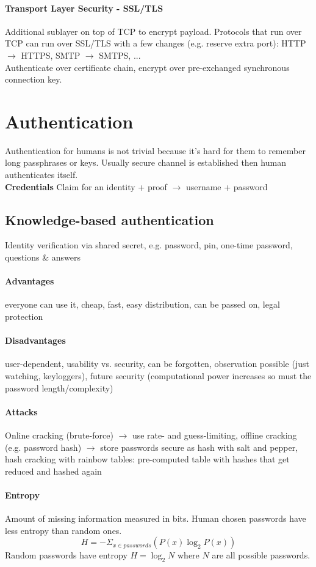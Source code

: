 \documentclass[12pt]{article}
\begin{document}
	\paragraph{Transport Layer Security - SSL/TLS} Additional sublayer on top of TCP to encrypt payload. Protocols that run over TCP can run over SSL/TLS with a few changes (e.g. reserve extra port): HTTP $\rightarrow$ HTTPS, SMTP $\rightarrow$ SMTPS, ...\\
	Authenticate over certificate chain, encrypt over pre-exchanged synchronous connection key.
	
	\section{Authentication}
	Authentication for humans is not trivial because it's hard for them to remember long passphrases or keys. Usually secure channel is established then human authenticates itself.\\
	\textbf{Credentials} Claim for an identity + proof $\rightarrow$ username + password
	
	\subsection{Knowledge-based authentication}
	Identity verification via shared secret, e.g. password, pin, one-time password, questions \& answers
	\paragraph{Advantages} everyone can use it, cheap, fast, easy distribution, can be passed on, legal protection
	\paragraph{Disadvantages} user-dependent, usability vs. security, can be forgotten, observation possible (just watching, keyloggers), future security (computational power increases so must the password length/complexity)
	\paragraph{Attacks} Online cracking (brute-force) $\rightarrow$ use rate- and guess-limiting, offline cracking (e.g. password hash) $\rightarrow$ store passwords secure as hash with salt and pepper, hash cracking with rainbow tables: pre-computed table with hashes that get reduced and hashed again
	\paragraph{Entropy} Amount of missing information measured in bits. Human chosen passwords have less entropy than random ones.
	$$H = -\Sigma_{x \in passwords}(P(x) \log_2 P(x))$$
	Random passwords have entropy $H = \log_2 N$ where $N$ are all possible passwords.
\end{document}
